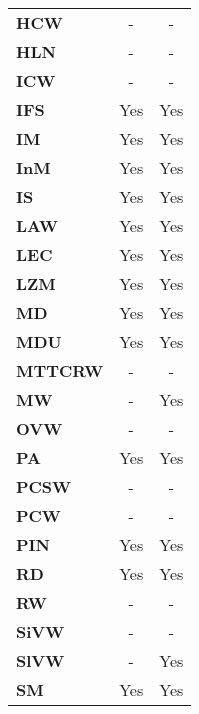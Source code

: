 \begin{table}[ht!]
\begin{tabular}{lcc}
\textbf{HCW}                  & -                  & -             \\
\textbf{HLN}                  & -                  & -             \\
\textbf{ICW}                  & -                  & -             \\
\textbf{IFS}                  & Yes                & Yes           \\
\textbf{IM}                   & Yes                & Yes           \\
\textbf{InM}                  & Yes                & Yes           \\
\textbf{IS}                   & Yes                & Yes           \\
\textbf{LAW}                  & Yes                & Yes           \\
\textbf{LEC}                  & Yes                & Yes           \\
\textbf{LZM}                  & Yes                & Yes           \\
\textbf{MD}                   & Yes                & Yes           \\
\textbf{MDU}                  & Yes                & Yes           \\
\textbf{MTTCRW}               & -                  & -             \\
\textbf{MW}                   & -                  & Yes           \\
\textbf{OVW}                  & -                  & -             \\
\textbf{PA}                   & Yes                & Yes           \\
\textbf{PCSW}                 & -                  & -             \\
\textbf{PCW}                  & -                  & -             \\
\textbf{PIN}                  & Yes                & Yes           \\
\textbf{RD}                   & Yes                & Yes           \\
\textbf{RW}                   & -                  & -             \\
\textbf{SiVW}                 & -                  & -             \\
\textbf{SlVW}                 & -                  & Yes           \\
\textbf{SM}                   & Yes                & Yes           \\

\end{tabular}
\end{table}
